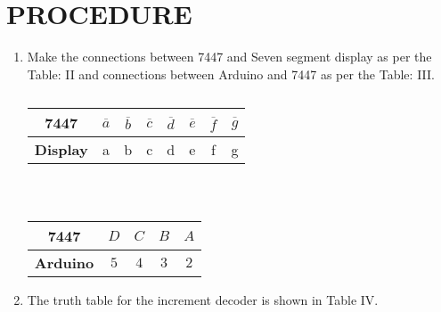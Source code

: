 \documentclass[conference]{IEEEtran}
\begin{document}
\section{PROCEDURE}
\begin {enumerate}
\item Make the connections between 7447 and Seven segment display as per the Table: II and connections between Arduino and 7447 as per the Table: III.
\begin{table}                       
\centering                          
\begin{tabular}{| c | c | c | c | c | c | c | c |} \hline                                
	\textbf{7447} & $\overline{a}$ & $\overline{b}$ & $ \overline{c}$ & $\overline{d}$ & $\overline{e}$ & $\overline{f}$  & $\overline{g}$ \\\hline 
\textbf{Display} & a & b & c & d & e & f & g \\ \hline                           
\end{tabular}             
\vspace{0.1cm}                                 
\caption{\label{tab:widgets}}                     
\end{table} \\

\begin{table} 
\centering
\begin{tabular}{| c | c | c | c | c |} \hline
\textbf{7447} & $D$ & $C$ & $B$ & $A$ \\\hline
\textbf{Arduino} & $5$ & $4$ & $3$ & $2$ \\ \hline 
\end{tabular}
\vspace{0.1cm}
\caption{\label{tab:widgets}}
\end{table}
\item The truth table for the increment decoder is shown in Table IV.


\end{enumerate}
\end{document}
